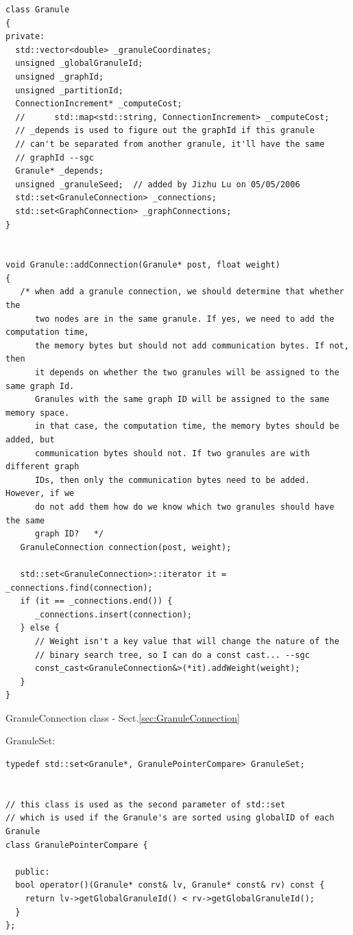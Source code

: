 \begin{lstlisting}
class Granule
{
private:
  std::vector<double> _granuleCoordinates;
  unsigned _globalGranuleId;
  unsigned _graphId;
  unsigned _partitionId;
  ConnectionIncrement* _computeCost;
  //      std::map<std::string, ConnectionIncrement> _computeCost;
  // _depends is used to figure out the graphId if this granule
  // can't be separated from another granule, it'll have the same
  // graphId --sgc
  Granule* _depends;
  unsigned _granuleSeed;  // added by Jizhu Lu on 05/05/2006
  std::set<GranuleConnection> _connections;
  std::set<GraphConnection> _graphConnections;
}


void Granule::addConnection(Granule* post, float weight)
{
   /* when add a granule connection, we should determine that whether the
      two nodes are in the same granule. If yes, we need to add the computation time,
      the memory bytes but should not add communication bytes. If not, then
      it depends on whether the two granules will be assigned to the same graph Id.
      Granules with the same graph ID will be assigned to the same memory space.
      in that case, the computation time, the memory bytes should be added, but
      communication bytes should not. If two granules are with different graph
      IDs, then only the communication bytes need to be added. However, if we
      do not add them how do we know which two granules should have the same
      graph ID?   */
   GranuleConnection connection(post, weight);

   std::set<GranuleConnection>::iterator it = _connections.find(connection); 
   if (it == _connections.end()) {
      _connections.insert(connection);
   } else {
      // Weight isn't a key value that will change the nature of the
      // binary search tree, so I can do a const cast... --sgc
      const_cast<GranuleConnection&>(*it).addWeight(weight);
   }
}
\end{lstlisting}
GranuleConnection class - Sect.\ref{sec:GranuleConnection}

GranuleSet:
\begin{lstlisting}
typedef std::set<Granule*, GranulePointerCompare> GranuleSet;


// this class is used as the second parameter of std::set
// which is used if the Granule's are sorted using globalID of each Granule
class GranulePointerCompare {

  public:
  bool operator()(Granule* const& lv, Granule* const& rv) const {
    return lv->getGlobalGranuleId() < rv->getGlobalGranuleId();
  }
};
\end{lstlisting}



